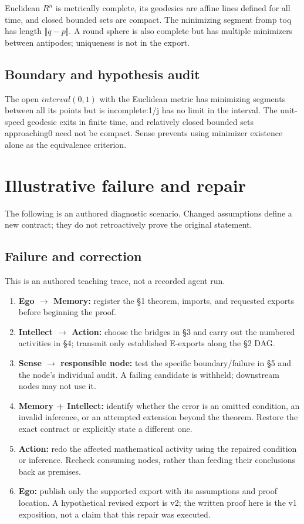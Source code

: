 \documentclass[preprint,12pt,aps,pra,showkeys,amsmath,amssymb,superscriptaddress,floatfix]{revtex4-2}
\theoremstyle{definition}
\theoremstyle{remark}
\providecommand{\tightlist}{\setlength{\itemsep}{2pt}\setlength{\parskip}{0pt}}
\begin{document}
Euclidean \(R^{n}\) is metrically complete, its geodesics are affine
lines defined for all time, and closed bounded sets are compact. The
minimizing segment fromp toq has length \(\Vert q-p\Vert\). A round
sphere is also complete but has multiple minimizers between antipodes;
uniqueness is not in the export.

\subsection{Boundary and hypothesis audit}

The open \(interval(0,1)\) with the Euclidean metric has minimizing
segments between all its points but is incomplete:1/j has no limit in
the interval. The unit-speed geodesic exits in finite time, and
relatively closed bounded sets approaching0 need not be compact. Sense
prevents using minimizer existence alone as the equivalence criterion.

\section{Illustrative failure and repair}

The following is an authored diagnostic scenario. Changed assumptions
define a new contract; they do not retroactively prove the original
statement.

\subsection{Failure and correction}
This is an authored teaching trace, not a recorded agent run.

\begin{enumerate}
\def\labelenumi{\arabic{enumi}.}
\tightlist
\item
  \textbf{Ego \(\to\) Memory:} register the §1 theorem, imports, and
  requested exports before beginning the proof.
\item
  \textbf{Intellect \(\to\) Action:} choose the bridges in §3 and carry
  out the numbered activities in §4; transmit only established E-exports
  along the §2 DAG.
\item
  \textbf{Sense \(\to\) responsible node:} test the specific
  boundary/failure in §5 and the node's individual audit. A failing
  candidate is withheld; downstream nodes may not use it.
\item
  \textbf{Memory + Intellect:} identify whether the error is an omitted
  condition, an invalid inference, or an attempted extension beyond the
  theorem. Restore the exact contract or explicitly state a different
  one.
\item
  \textbf{Action:} redo the affected mathematical activity using the
  repaired condition or inference. Recheck consuming nodes, rather than
  feeding their conclusions back as premises.
\item
  \textbf{Ego:} publish only the supported export with its assumptions
  and proof location. A hypothetical revised export is v2; the written
  proof here is the v1 exposition, not a claim that this repair was
  executed.
\end{enumerate}
\end{document}
